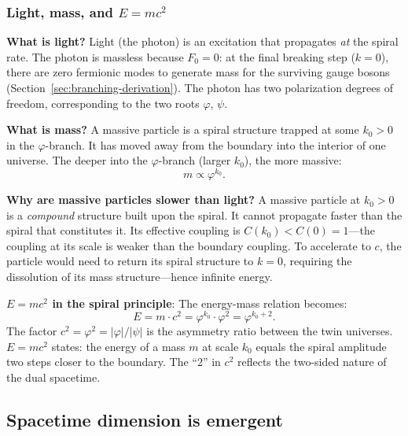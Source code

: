 \documentclass[12pt,a4paper]{article}
\begin{document}
\subsubsection{Light, mass, and $E = mc^2$}

\textbf{What is light?} Light (the photon) is an excitation that propagates \emph{at} the spiral rate. The photon is massless because $F_0 = 0$: at the final breaking step ($k = 0$), there are zero fermionic modes to generate mass for the surviving gauge bosons (Section~\ref{sec:branching-derivation}). The photon has two polarization degrees of freedom, corresponding to the two roots $\varphi$, $\psi$.

\textbf{What is mass?} A massive particle is a spiral structure trapped at some $k_0 > 0$ in the $\varphi$-branch. It has moved away from the boundary into the interior of one universe. The deeper into the $\varphi$-branch (larger $k_0$), the more massive:
\begin{equation}
m \propto \varphi^{k_0}.
\end{equation}

\textbf{Why are massive particles slower than light?} A massive particle at $k_0 > 0$ is a \emph{compound} structure built upon the spiral. It cannot propagate faster than the spiral that constitutes it. Its effective coupling is $C(k_0) < C(0) = 1$---the coupling at its scale is weaker than the boundary coupling. To accelerate to $c$, the particle would need to return its spiral structure to $k = 0$, requiring the dissolution of its mass structure---hence infinite energy.

\textbf{$E = mc^2$ in the spiral principle}: The energy-mass relation becomes:
\begin{equation}
E = m \cdot c^2 = \varphi^{k_0} \cdot \varphi^2 = \varphi^{k_0 + 2}.
\end{equation}
The factor $c^2 = \varphi^2 = |\varphi|/|\psi|$ is the asymmetry ratio between the twin universes. $E = mc^2$ states: the energy of a mass $m$ at scale $k_0$ equals the spiral amplitude two steps closer to the boundary. The ``2'' in $c^2$ reflects the two-sided nature of the dual spacetime.



\subsection{Spacetime dimension is emergent}
\label{sec:spacetime-dimension}
\end{document}
